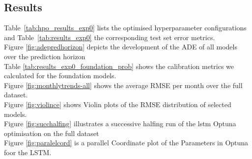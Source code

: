         \subsection{Results}
        Table~\ref{tab:hpo_results_exp0} lists the optimised hyperparameter configurations and Table~\ref{tab:results_exp0} the corresponding test set error metrics.\\            %
        Figure \ref{fig:adepredhorizon} depicts the development of the \ac{ADE} of all models over the prediction horizon\\        
        Table \ref{tab:results_exp0_foundation_prob} shows the calibration metrics we calculated for the foundation models.\\
        Figure \ref{fig:monthlytrends-all} shows the average \ac{RMSE} per month over the full dataset.\\
        Figure \ref{fig:violince} shows Violin plots of the RMSE distribution of selected models.\\
        Figure \ref{fig:succhalfing} illustrates a successive halfing run of the lstm Optuna optimisation on the full dataset\\
        Figure \ref{fig:paralelcord} is a parallel Coordinate plot of the Parameters in Optuna foor the LSTM.\\


